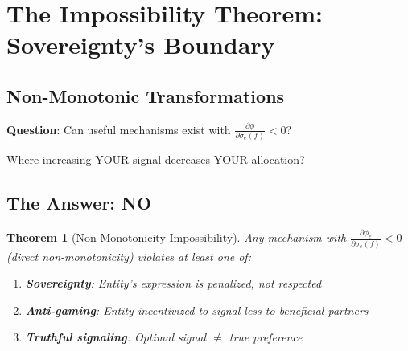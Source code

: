 \documentclass[11pt,a4paper]{article}
\newtheorem{theorem}{Theorem}[section]
\theoremstyle{definition}
\theoremstyle{remark}
\begin{document}
\section{The Impossibility Theorem: Sovereignty's Boundary}

\subsection{Non-Monotonic Transformations}

\textbf{Question}: Can useful mechanisms exist with $\frac{\partial \phi}{\partial \sigma_e(f)} < 0$?

Where increasing YOUR signal decreases YOUR allocation?

\subsection{The Answer: NO}

\begin{theorem}[Non-Monotonicity Impossibility]
\label{thm:non-monotonic-impossible}
Any mechanism with $\frac{\partial \phi_e}{\partial \sigma_e(f)} < 0$ (direct non-monotonicity) violates at least one of:
\begin{enumerate}
\item \textbf{Sovereignty}: Entity's expression is penalized, not respected
\item \textbf{Anti-gaming}: Entity incentivized to signal \textit{less} to beneficial partners
\item \textbf{Truthful signaling}: Optimal signal $\ne$ true preference
\end{enumerate}
\end{theorem}
\end{document}
